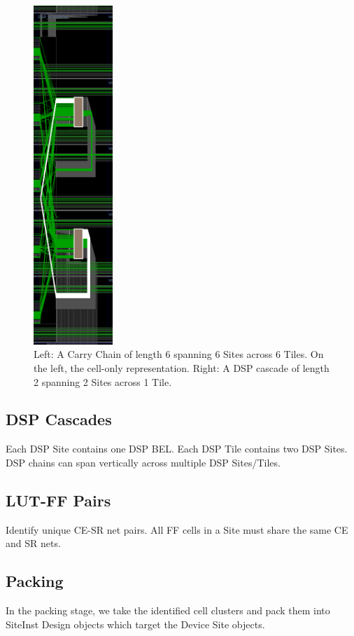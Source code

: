 \documentclass[twocolumn]{article}
\begin{document}
\begin{figure}
                \includegraphics[width=3.0cm]{figures/dsp_cascade_routes.png}
                \caption{Left: A Carry Chain of length 6 spanning 6 Sites across 6 Tiles. On the left, the cell-only representation. Right: A DSP cascade of length 2 spanning 2 Sites across 1 Tile.}
                \label{fig:device_carry_chain_routing}
            \end{figure}
        \subsection{DSP Cascades}
            Each DSP Site contains one DSP BEL.
            Each DSP Tile contains two DSP Sites.
            DSP chains can span vertically across multiple DSP Sites/Tiles.

        \subsection{LUT-FF Pairs}
            Identify unique CE-SR net pairs. All FF cells in a Site must share the same CE and SR nets.
    \subsection{Packing}
        In the packing stage, we take the identified cell clusters and pack them into SiteInst Design objects which target the Device Site objects.
\end{document}
